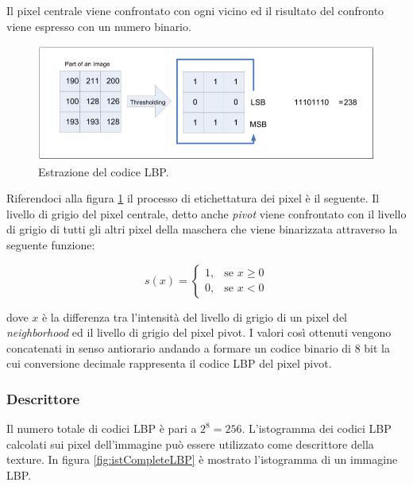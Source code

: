  Il pixel centrale viene confrontato con ogni vicino ed il risultato del confronto viene espresso con un numero binario.\\

\begin{figure}[ht]
\begin{center}
\includegraphics[width=.95\textwidth]{img/LBP_code}
\caption{ Estrazione del codice LBP.}
\label{fig:LBPcode}
\end{center}
\end{figure}

Riferendoci alla figura \ref{fig:LBPcode} il processo di etichettatura dei pixel è il seguente. Il livello di grigio del pixel centrale, detto anche \emph{pivot} viene confrontato con il livello di grigio di tutti gli altri pixel della maschera che viene binarizzata attraverso la seguente funzione:

\begin{equation}
s(x) = 	\begin{cases} 1, & \mbox{se } x \ge 0 \\ 0, & \mbox{se } x < 0 \end{cases}
\end{equation}

dove $x$ è la differenza tra l'intensità del livello di grigio di un pixel del \emph{neighborhood} ed il livello di grigio del pixel pivot. I valori così ottenuti vengono concatenati in senso antiorario andando a formare un codice binario di 8 bit la cui conversione decimale rappresenta il codice \acs{LBP} del pixel pivot.

\subsubsection*{Descrittore}
Il numero totale di codici \acs{LBP} è pari a $2^8 = 256$.
L'istogramma dei codici LBP calcolati sui pixel dell'immagine può essere utilizzato come descrittore della texture. In figura \ref{fig:istCompleteLBP} è mostrato l'istogramma di un immagine LBP.

